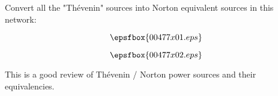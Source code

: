 

Convert all the "Th\'evenin" sources into Norton equivalent sources in this network:

$$\epsfbox{00477x01.eps}$$







$$\epsfbox{00477x02.eps}$$







This is a good review of Th\'evenin / Norton power sources and their equivalencies.




